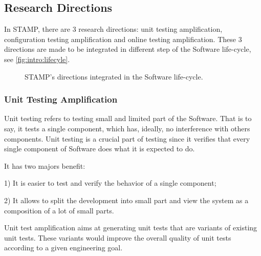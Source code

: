 \subsection{Research Directions}
\label{subsec:intro:research-directions}

In STAMP, there are 3 research directions: unit testing amplification, configuration testing amplification and online testing amplification.
These 3 directions are made to be integrated in different step of the Software life-cycle, see \autoref{fig:intro:lifecyle}.

\begin{figure}[h]
	\centering
	\caption{STAMP's directions integrated in the Software life-cycle.}
	\label{fig:intro:lifecyle}
\end{figure}

\subsubsection{Unit Testing Amplification}
\label{subsubsec:intro:research-directions:unit-test-ampl}

Unit testing refers to testing small and limited part of the Software.
That is to say, it tests a single component, which has, ideally, no interference with others components.
Unit testing is a crucial part of testing since it verifies that every single component of Software does what it is expected to do.

It has two majors benefit:

1) It is easier to test and verify the behavior of a single component;

2) It allows to split the development into small part and view the system as a composition of a lot of small parts.

Unit test amplification aims at generating unit tests that are variants of existing unit tests.
These variants would improve the overall quality of unit tests according to a given engineering goal.

